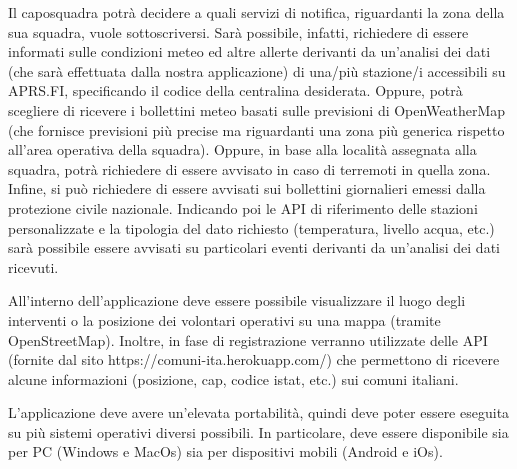 Il caposquadra potrà decidere a quali servizi di notifica, riguardanti la zona della sua squadra, vuole sottoscriversi. Sarà possibile, infatti, richiedere di essere informati sulle condizioni meteo ed altre allerte derivanti da un’analisi dei dati (che sarà effettuata dalla nostra applicazione) di una/più stazione/i accessibili su APRS.FI, specificando il codice della centralina desiderata. Oppure, potrà scegliere di ricevere i bollettini meteo basati sulle previsioni di OpenWeatherMap (che fornisce previsioni più precise ma riguardanti una zona più generica rispetto all’area operativa della squadra). Oppure, in base alla località assegnata alla squadra, potrà richiedere di essere avvisato in caso di terremoti in quella zona. Infine, si può richiedere di essere avvisati sui bollettini giornalieri emessi dalla protezione civile nazionale. Indicando poi le API di riferimento delle stazioni personalizzate e la tipologia del dato richiesto (temperatura, livello acqua, etc.) sarà possibile essere avvisati su particolari eventi derivanti da un’analisi dei dati ricevuti. 

All’interno dell’applicazione deve essere possibile visualizzare il luogo degli interventi o la posizione dei volontari operativi su una mappa (tramite OpenStreetMap). Inoltre, in fase di registrazione verranno utilizzate delle API (fornite dal sito https://comuni-ita.herokuapp.com/) che permettono di ricevere alcune informazioni (posizione, cap, codice istat, etc.) sui comuni italiani.

L’applicazione deve avere un'elevata portabilità, quindi deve poter essere eseguita su più sistemi operativi diversi possibili. In particolare, deve essere disponibile sia per PC (Windows e MacOs) sia per dispositivi mobili (Android e iOs). 